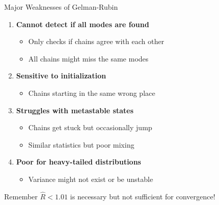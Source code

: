 \begin{frame}{Major Weaknesses of Gelman-Rubin}
	\begin{enumerate}
		\item \textbf{Cannot detect if all modes are found}
		      \begin{itemize}
			      \item Only checks if chains agree with each other
			      \item All chains might miss the same modes
		      \end{itemize}

		\item \textbf{Sensitive to initialization}
		      \begin{itemize}
			      \item Chains starting in the same wrong place
		      \end{itemize}

		\item \textbf{Struggles with metastable states}
		      \begin{itemize}
			      \item Chains get stuck but occasionally jump
			      \item Similar statistics but poor mixing
		      \end{itemize}

		\item \textbf{Poor for heavy-tailed distributions}
		      \begin{itemize}
			      \item Variance might not exist or be unstable
		      \end{itemize}
	\end{enumerate}

	\vspace{0.5cm}
	\begin{block}{Remember}
		$\hat{R} < 1.01$ is necessary but not sufficient for convergence!
	\end{block}
\end{frame}

